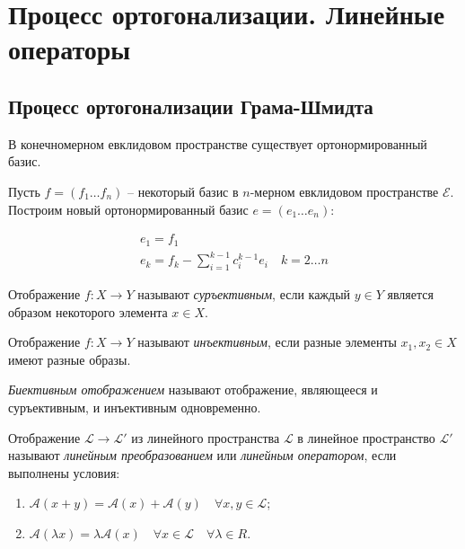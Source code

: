 \section{Процесс ортогонализации. Линейные операторы}

\subsection{Процесс ортогонализации Грама-Шмидта}

\begin{theorem}
  В конечномерном евклидовом пространстве существует ортонормированный базис.
\end{theorem}

Пусть $f = \left( f_1 \ldots f_n \right) $ -- некоторый базис в $n$-мерном евклидовом пространстве $\mathcal{E}$. Построим новый ортонормированный базис $e = \left( e_1 \ldots e_n \right)$:

\begin{gather*}
  e_1 = f_1 \\
  e_k = f_k - \sum_{i=1}^{k-1} c_i^{k-1} e_i \quad k = 2 \ldots n
\end{gather*}

\begin{definition}
  Отображение $f: X \to Y$ называют \textit{суръективным}, если каждый $y \in Y$ является образом некоторого элемента $x \in X$.
\end{definition}

\begin{definition}
  Отображение $f: X \to Y$ называют \textit{инъективным}, если разные элементы $x_1, x_2 \in X$ имеют разные образы.
\end{definition}

\begin{definition}
  \textit{Биективным отображением} называют отображение, являющееся и суръективным, и инъективным одновременно.
\end{definition}

\begin{definition} 
  \label{def:32}
  Отображение $\mathcal{L} \to \mathcal{L}'$ из линейного пространства $\mathcal{L}$ в линейное пространство $\mathcal{L}'$ называют  \textit{линейным преобразованием} или \textit{линейным оператором}, если выполнены условия:
  \begin{enumerate}
    \item $\mathcal{A}(x + y) = \mathcal{A}(x) + \mathcal{A}(y) \quad \forall x, y \in \mathcal{L}$;
    \item $\mathcal{A}(\lambda x) = \lambda \mathcal{A}(x) \quad \forall x \in \mathcal{L} \quad \forall \lambda \in R$.
  \end{enumerate}
\end{definition}

